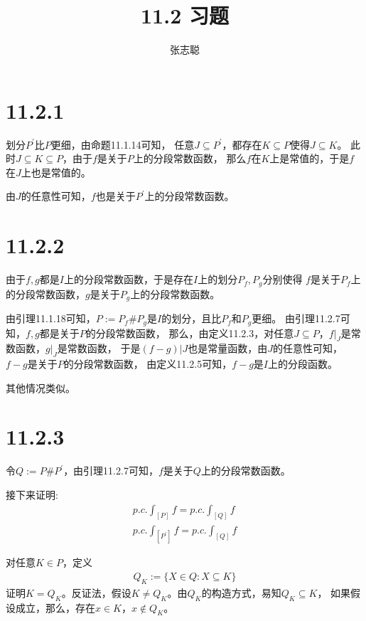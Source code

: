 \documentclass{article}
\begin{document}
\title{11.2 习题}
\author{张志聪}
\maketitle

\section*{11.2.1}

划分$P^\prime$比$P$更细，由命题11.1.14可知，
任意$J \subseteq P^\prime$，都存在$K \subseteq P$使得$J \subseteq K$。
此时$J \subseteq K \subseteq P$，由于$f$是关于$P$上的分段常数函数，
那么$f$在$K$上是常值的，于是$f$在$J$上也是常值的。

由$J$的任意性可知，$f$也是关于$P^\prime$上的分段常数函数。

\section*{11.2.2}

由于$f,g$都是$I$上的分段常数函数，于是存在$I$上的划分$P_f, P_g$分别使得
$f$是关于$P_f$上的分段常数函数，$g$是关于$P_g$上的分段常数函数。

由引理11.1.18可知，$P := P_f \# P_g$是$I$的划分，且比$P_f$和$P_g$更细。
由引理11.2.7可知，$f,g$都是关于$P$的分段常数函数，
那么，由定义11.2.3，对任意$J \subseteq P$，$f|_J$是常数函数，$g|_J$是常数函数，
于是$(f-g)|J$也是常量函数，由$J$的任意性可知，$f-g$是关于$P$的分段常数函数，
由定义11.2.5可知，$f-g$是$I$上的分段函数。

其他情况类似。

\section*{11.2.3}

令$Q := P \# P^\prime$，由引理11.2.7可知，$f$是关于$Q$上的分段常数函数。

接下来证明:
\begin{align}
  p.c.\int_{[P]} f = p.c.\int_{[Q]}f \\
  p.c.\int_{[P^\prime]} f = p.c.\int_{[Q]}f
\end{align}

对任意$K \in P$，定义
\begin{align*}
  Q_K := \{X \in Q : X \subseteq K\}
\end{align*}
证明$K = Q_K$。反证法，假设$K \neq Q_K$。由$Q_K$的构造方式，易知$Q_K \subseteq K$，
如果假设成立，那么，存在$x \in K$，$x \notin Q_K$。
\end{document}
